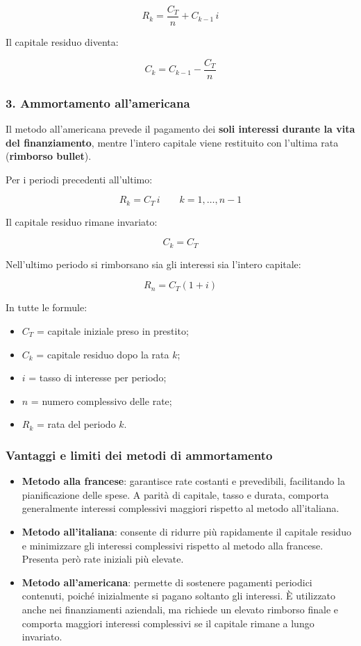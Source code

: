 \[
R_k=\frac{C_T}{n}+C_{k-1}\,i
\]

\noindent Il capitale residuo diventa:

\[
C_k=C_{k-1}-\frac{C_T}{n}
\]

\subsubsection*{3. Ammortamento all'americana}

\noindent Il metodo all'americana prevede il pagamento dei \textbf{soli interessi durante la vita del finanziamento}, mentre l'intero capitale viene restituito con l'ultima rata (\textbf{rimborso bullet}).

\medskip

\noindent Per i periodi precedenti all'ultimo:

\[
\boxed{R_k=C_T\,i \qquad k=1,\ldots,n-1}
\]

\noindent Il capitale residuo rimane invariato:

\[
C_k=C_T
\]

\noindent Nell'ultimo periodo si rimborsano sia gli interessi sia l'intero capitale:

\[
\boxed{R_n=C_T(1+i)}
\]

\noindent In tutte le formule:

\begin{itemize}
    \item $C_T$ = capitale iniziale preso in prestito;
    \item $C_k$ = capitale residuo dopo la rata $k$;
    \item $i$ = tasso di interesse per periodo;
    \item $n$ = numero complessivo delle rate;
    \item $R_k$ = rata del periodo $k$.
\end{itemize}

\subsubsection*{Vantaggi e limiti dei metodi di ammortamento}

\begin{itemize}
    \item \textbf{Metodo alla francese}: garantisce rate costanti e prevedibili, facilitando la pianificazione delle spese. A parità di capitale, tasso e durata, comporta generalmente interessi complessivi maggiori rispetto al metodo all'italiana.

    \item \textbf{Metodo all'italiana}: consente di ridurre più rapidamente il capitale residuo e minimizzare gli interessi complessivi rispetto al metodo alla francese. Presenta però rate iniziali più elevate.

    \item \textbf{Metodo all'americana}: permette di sostenere pagamenti periodici contenuti, poiché inizialmente si pagano soltanto gli interessi. È utilizzato anche nei finanziamenti aziendali, ma richiede un elevato rimborso finale e comporta maggiori interessi complessivi se il capitale rimane a lungo invariato.
\end{itemize}

